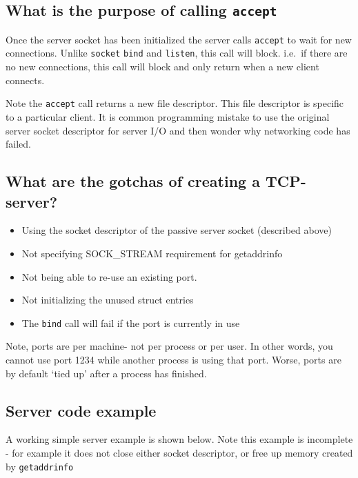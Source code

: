 \subsection{\texorpdfstring{What is the purpose of calling
\texttt{accept}}{What is the purpose of calling accept}}\label{what-is-the-purpose-of-calling-accept}

Once the server socket has been initialized the server calls
\texttt{accept} to wait for new connections. Unlike \texttt{socket}
\texttt{bind} and \texttt{listen}, this call will block. i.e.~if there
are no new connections, this call will block and only return when a new
client connects.

Note the \texttt{accept} call returns a new file descriptor. This file
descriptor is specific to a particular client. It is common programming
mistake to use the original server socket descriptor for server I/O and
then wonder why networking code has failed.

\subsection{What are the gotchas of creating a
TCP-server?}\label{what-are-the-gotchas-of-creating-a-tcp-server}

\begin{itemize}
\itemsep1pt\parskip0pt
\item
  Using the socket descriptor of the passive server socket (described
  above)
\item
  Not specifying SOCK\_STREAM requirement for getaddrinfo
\item
  Not being able to re-use an existing port.
\item
  Not initializing the unused struct entries
\item
  The \texttt{bind} call will fail if the port is currently in use
\end{itemize}

Note, ports are per machine- not per process or per user. In other
words, you cannot use port 1234 while another process is using that
port. Worse, ports are by default `tied up' after a process has
finished.

\subsection{Server code example}\label{server-code-example}

A working simple server example is shown below. Note this example is
incomplete - for example it does not close either socket descriptor, or
free up memory created by \texttt{getaddrinfo}

